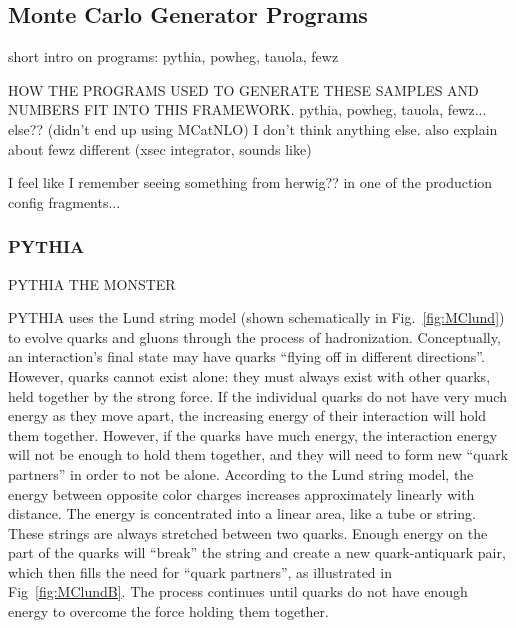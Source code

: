 \subsection{Monte Carlo Generator Programs}
\label{sim:MCGens}

short intro on programs: pythia, powheg, tauola, fewz

HOW THE PROGRAMS USED TO GENERATE THESE SAMPLES AND NUMBERS 
FIT INTO THIS FRAMEWORK.  
   pythia, powheg, tauola, fewz... else??  (didn't end up using MCatNLO) 
I don't think anything else.  
also explain about fewz different (xsec integrator, sounds like)

I feel like I remember seeing something from herwig?? in one of the 
production config fragments...

\subsubsection{PYTHIA}
\label{sim:MCGensPythia}

PYTHIA THE MONSTER


PYTHIA uses the Lund string model 
(shown schematically in Fig.~\ref{fig:MClund})
to evolve 
quarks and gluons through the process of hadronization. %
Conceptually, an interaction's final state may have 
quarks 
``flying off in different directions''.  
However, quarks cannot exist alone: %
they must always exist with other quarks, 
held together by the strong force.  
If the individual quarks do not have very much energy 
as they move apart, 
the increasing energy of their interaction will hold them together.  
However, if the quarks have much energy, 
the interaction energy will not be enough to hold 
them together, 
and they will need to form new ``quark partners'' 
in order to not be alone.  
According to the Lund string model, 
the energy between opposite color charges 
increases approximately linearly with distance. 
The energy is concentrated into a linear area, 
like a tube or string.  
These strings are always stretched between two quarks.  
Enough energy on the part of the quarks will 
``break'' the string and 
create a new quark-antiquark pair, 
which then fills the need for ``quark partners'', 
as illustrated in Fig~\ref{fig:MClundB}.  
The process continues until quarks 
do not have enough energy to overcome 
the force holding them together.  %

